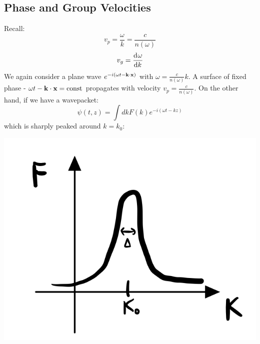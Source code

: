 \subsection{Phase and Group Velocities}
Recall:
\begin{equation}
    v_p = \frac{\omega}{k} = \frac{c}{n(\omega)}
\end{equation}
\begin{equation}
    v_g = \dod{\omega}{k}
\end{equation}
We again consider a plane wave $e^{-i(\omega t - \mathbf{k} \cdot \mathbf{x})}$ with $\omega = \frac{c}{n(\omega)}k$. A surface of fixed phase - $\omega t - \mathbf{k} \cdot \mathbf{x} = \text{const}$ propagates with velocity $v_p = \frac{c}{n(\omega)}$. On the other hand, if we have a wavepacket:
\begin{equation}
    \psi(t, z) = \int dk F(k)e^{-i(\omega t - kz)}
\end{equation}
which is sharply peaked around $k = k_0$:

\begin{center}
    \includegraphics[scale=0.35]{Lectures/Images/lec13-peaked.png}
\end{center}

